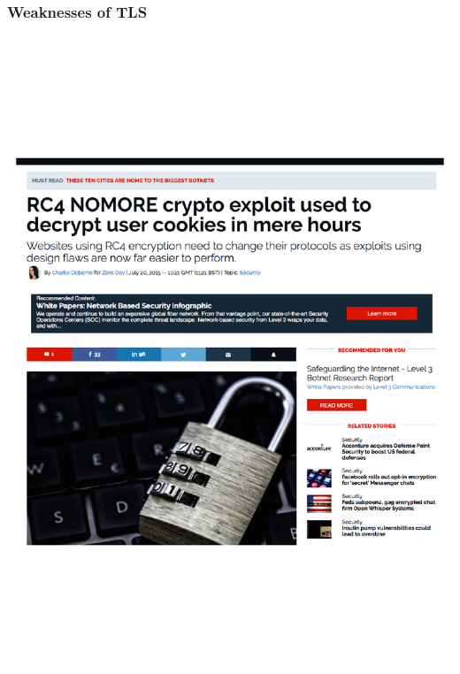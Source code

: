 \documentclass[aspectratio=169, lualatex, handout, 10pt,dvipsnames,svgnames]{beamer} %
\begin{document}
\begin{frame}
  \frametitle{Weaknesses of TLS}
    \vspace{-0.5cm}

  \begin{center}
    \includegraphics[scale=0.4]{Images/rc4-tls-attack.pdf}
  \end{center}

\end{frame}
\end{document}
